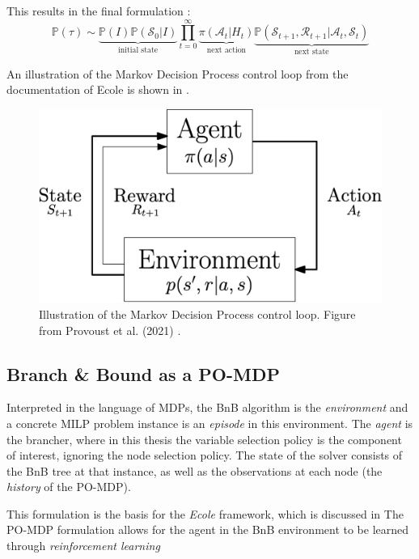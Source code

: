 This results in the final formulation \cite{prouvost2021ecole}:
\begin{equation}
    \mathbb{P}(\tau) \sim \underbrace{ \mathbb{P}(I) \mathbb{P}(\mathcal{S}_0 | I)  }_{\text{initial state}}
\prod_{t=0}^\infty \underbrace{\pi(\mathcal{A}_t | H_t)}_{\text{next action}}
\underbrace{\mathbb{P}(\mathcal{S}_{t+1}, \mathcal{R}_{t+1} | \mathcal{A}_t, \mathcal{S}_t)}_{\text{next state}}
\end{equation}

An illustration of the Markov Decision Process control loop from the documentation of \gls{Ecole} is shown in .

\begin{figure}
    \centering
    \includegraphics[width=0.55\linewidth]{img/mdp.png}
    \caption{Illustration of the Markov Decision Process control loop. Figure from Provoust et al. (2021) \cite{prouvost2021ecole}.}
    \label{fig:mdp}
\end{figure}



\subsection{Branch \& Bound as a PO-MDP}\label{ssec:pomdp}

Interpreted in the language of \gls{MDP}s, the \gls{BnB} algorithm is the \textit{environment} and a concrete \gls{MILP} problem instance is an \textit{episode} in this environment. The \textit{agent} is the brancher, where in this thesis the variable selection policy is the component of interest, ignoring the node selection policy. The state of the solver consists of the \gls{BnB} tree at that instance, as well as the observations at each node (the \textit{history} of the \gls{PO-MDP}).

This formulation is the basis for the \textit{Ecole} framework, which is discussed in 
The \gls{PO-MDP} formulation allows for the agent in the \gls{BnB} environment to be learned through \textit{reinforcement learning}




